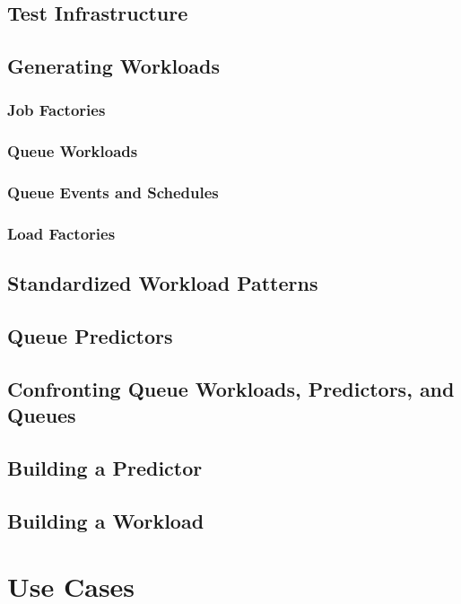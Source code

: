 \documentclass[12pt]{book}
\begin{document}
\section{Test Infrastructure}

\section{Generating Workloads}

\subsection{Job Factories}

\subsection{Queue Workloads}

\subsection{Queue Events and Schedules}

\subsection{Load Factories}

\section{Standardized Workload Patterns}

\section{Queue Predictors}

\section{Confronting Queue Workloads, Predictors, and Queues}

\section{Building a Predictor}

\section{Building a Workload}

\chapter{Use Cases}
\label{chap:use-cases}
\end{document}
